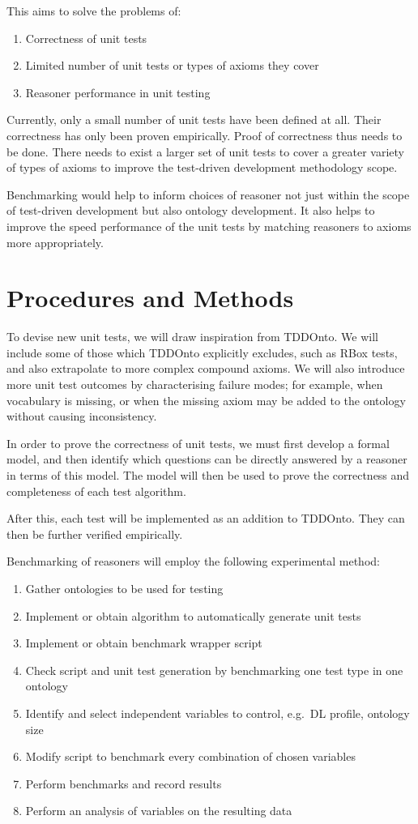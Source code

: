 \documentclass[draft]{sig-alternate}
\begin{document}
This aims to solve the problems of:
\begin{enumerate}[noitemsep]
  \item Correctness of unit tests
  \item Limited number of unit tests or types of axioms they cover
  \item Reasoner performance in unit testing
\end{enumerate}

Currently, only a small number of unit tests have been defined at all. Their correctness has only been proven empirically. Proof of correctness thus needs to be done. There needs to exist a larger set of unit tests to cover a greater variety of types of axioms to improve the test-driven development methodology scope.

Benchmarking would help to inform choices of reasoner not just within the scope of test-driven development but also ontology development. It also helps to improve the speed performance of the unit tests by matching reasoners to axioms more appropriately.

\section{Procedures and Methods}

To devise new unit tests, we will draw inspiration from TDDOnto.  We will include some of those which TDDOnto explicitly excludes, such as RBox tests, and also extrapolate to more complex compound axioms.  We will also introduce more unit test outcomes by characterising failure modes; for example, when vocabulary is missing, or when the missing axiom may be added to the ontology without causing inconsistency.

In order to prove the correctness of unit tests, we must first develop a formal model, and then identify which questions can be directly answered by a reasoner in terms of this model.  The model will then be used to prove the correctness and completeness of each test algorithm.

After this, each test will be implemented as an addition to TDDOnto.  They can then be further verified empirically.

Benchmarking of reasoners will employ the following experimental method:
\begin{enumerate}[noitemsep]
  \item Gather ontologies to be used for testing
  \item Implement or obtain algorithm to automatically generate unit tests
  \item Implement or obtain benchmark wrapper script
  \item Check script and unit test generation by benchmarking one test type in one ontology
  \item Identify and select independent variables to control, e.g.\ DL profile, ontology size
  \item Modify script to benchmark every combination of chosen variables
  \item Perform benchmarks and record results
  \item Perform an analysis of variables on the resulting data
\end{enumerate}
\end{document}
